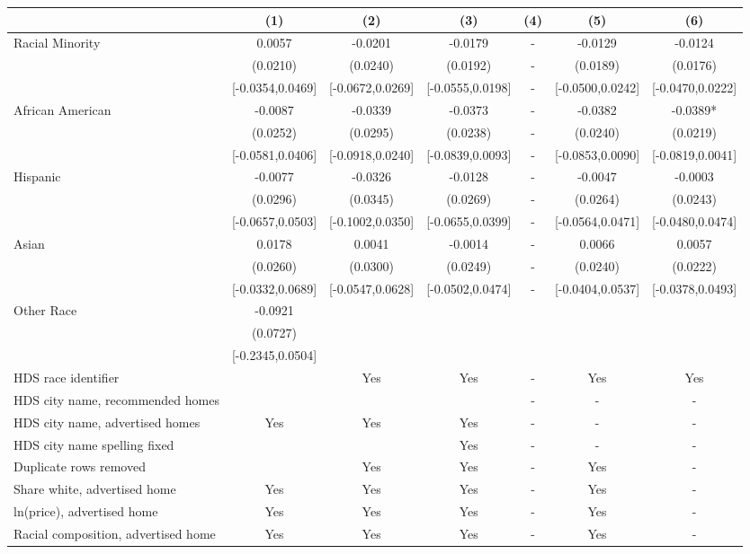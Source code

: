 \begin{table}[htbp]
{\begin{tabular}{l*{6}{c}}
                    &\multicolumn{1}{c}{(1)}   &\multicolumn{1}{c}{(2)}   &\multicolumn{1}{c}{(3)}   &\multicolumn{1}{c}{(4)}   &\multicolumn{1}{c}{(5)}   &\multicolumn{1}{c}{(6)}\\
\midrule
Racial Minority & 0.0057 & -0.0201 & -0.0179 & - & -0.0129 & -0.0124 \\
 & (0.0210) & (0.0240) & (0.0192) & - & (0.0189) & (0.0176) \\
 & [-0.0354,0.0469] & [-0.0672,0.0269] & [-0.0555,0.0198] & - & [-0.0500,0.0242] & [-0.0470,0.0222] \\
\midrule
African American & -0.0087 & -0.0339 & -0.0373 & - & -0.0382 & -0.0389* \\
 & (0.0252) & (0.0295) & (0.0238) & - & (0.0240) & (0.0219) \\
 & [-0.0581,0.0406] & [-0.0918,0.0240] & [-0.0839,0.0093] & - & [-0.0853,0.0090] & [-0.0819,0.0041] \\
Hispanic & -0.0077 & -0.0326 & -0.0128 & - & -0.0047 & -0.0003 \\
 & (0.0296) & (0.0345) & (0.0269) & - & (0.0264) & (0.0243) \\
 & [-0.0657,0.0503] & [-0.1002,0.0350] & [-0.0655,0.0399] & - & [-0.0564,0.0471] & [-0.0480,0.0474] \\
Asian & 0.0178 & 0.0041 & -0.0014 & - & 0.0066 & 0.0057 \\
 & (0.0260) & (0.0300) & (0.0249) & - & (0.0240) & (0.0222) \\
 & [-0.0332,0.0689] & [-0.0547,0.0628] & [-0.0502,0.0474] & - & [-0.0404,0.0537] & [-0.0378,0.0493] \\
Other Race & -0.0921 &  &  &  &  &  \\
 & (0.0727) &  &  &  &  &  \\
 & [-0.2345,0.0504] &  &  &  &  &  \\
\midrule
HDS race identifier & & Yes & Yes & - & Yes & Yes \\
HDS city name, recommended homes &  &  &  &- & - & -\\
HDS city name, advertised homes & Yes & Yes & Yes & - & - & -\\
HDS city name spelling fixed & & & Yes & - & - & -\\
Duplicate rows removed &  & Yes & Yes & - & Yes & - \\
\midrule
Share white, advertised home  & Yes & Yes & Yes & - & Yes & - \\
ln(price), advertised home  & Yes & Yes & Yes & - & Yes & - \\
Racial composition, advertised home & Yes & Yes & Yes & - & Yes & - \\

\end{tabular}}
\end{table}
